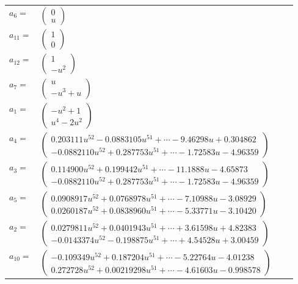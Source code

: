 \documentclass[1p]{elsarticle_modified}
\theoremstyle{definition}
\begin{document}
\begin{tabular}{m{7pt} m{180pt} m{7pt} m{180pt} }
\flushright $a_{6}=$&$\begin{pmatrix}0\\u\end{pmatrix}$ \\
\flushright $a_{11}=$&$\begin{pmatrix}1\\0\end{pmatrix}$ \\
\flushright $a_{12}=$&$\begin{pmatrix}1\\- u^2\end{pmatrix}$ \\
\flushright $a_{7}=$&$\begin{pmatrix}u\\- u^3+u\end{pmatrix}$ \\
\flushright $a_{1}=$&$\begin{pmatrix}- u^2+1\\u^4-2 u^2\end{pmatrix}$ \\
\flushright $a_{4}=$&$\begin{pmatrix}0.203111 u^{52}-0.0883105 u^{51}+\cdots-9.46298 u+0.304862\\-0.0882110 u^{52}+0.287753 u^{51}+\cdots-1.72583 u-4.96359\end{pmatrix}$ \\
\flushright $a_{3}=$&$\begin{pmatrix}0.114900 u^{52}+0.199442 u^{51}+\cdots-11.1888 u-4.65873\\-0.0882110 u^{52}+0.287753 u^{51}+\cdots-1.72583 u-4.96359\end{pmatrix}$ \\
\flushright $a_{5}=$&$\begin{pmatrix}0.0908917 u^{52}+0.0768978 u^{51}+\cdots-7.10988 u-3.08929\\0.0260187 u^{52}+0.0838960 u^{51}+\cdots-5.33771 u-3.10420\end{pmatrix}$ \\
\flushright $a_{2}=$&$\begin{pmatrix}0.0279811 u^{52}+0.0401943 u^{51}+\cdots+3.61598 u+4.82383\\-0.0143374 u^{52}-0.198875 u^{51}+\cdots+4.54528 u+3.00459\end{pmatrix}$ \\
\flushright $a_{10}=$&$\begin{pmatrix}-0.109349 u^{52}+0.187204 u^{51}+\cdots-5.22764 u-4.01238\\0.272728 u^{52}+0.00219298 u^{51}+\cdots-4.61603 u-0.998578\end{pmatrix}$ \\

\end{tabular}
\end{document}

